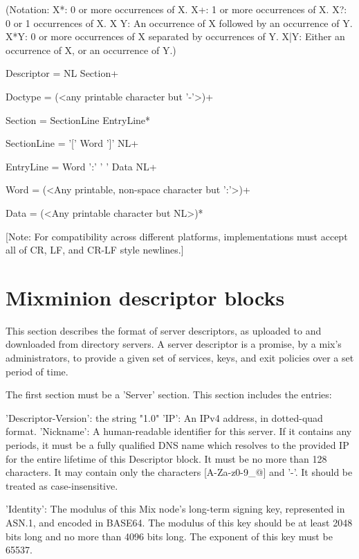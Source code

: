 (Notation:  X*: 0 or more occurrences of X.
            X+: 1 or more occurrences of X.
            X?: 0 or 1 occurrences of X.
            X Y: An occurrence of X followed by an occurrence of Y.
            X*{Y}: 0 or more occurrences of X separated by occurrences
                  of Y.
            X|Y: Either an occurrence of X, or an occurrence of Y.)

Descriptor = NL Section+ 

Doctype = (<any printable character but '-'>)+

Section = SectionLine EntryLine*

SectionLine = '[' Word ']' NL+

EntryLine = Word ':' ' ' Data NL+

Word = (<Any printable, non-space character but ':'>)+

Data = (<Any printable character but NL>)*

[Note: For compatibility across different platforms, implementations must
  accept all of CR, LF, and CR-LF style newlines.]

\section{Mixminion descriptor blocks}

This section describes the format of server descriptors, as uploaded
to and downloaded from directory servers.  A server descriptor is a
promise, by a mix's administrators, to provide a given set of
services, keys, and exit policies over a set period of time.

The first section must be a 'Server' section.  This section includes
the entries:

     'Descriptor-Version':  the string "1.0"
     'IP': An IPv4 address, in dotted-quad format.
     'Nickname': A human-readable identifier for this server.  If it
         contains any periods, it must be a fully qualified DNS name
         which resolves to the provided IP for the entire lifetime of
         this Descriptor block.  It must be no more than 128
         characters.  It may contain only the characters 
         [A-Za-z0-9_@] and '-'.  It should be treated as
         case-insensitive.

     'Identity': The modulus of this Mix node's long-term signing key,
         represented in ASN.1, and encoded in BASE64.  The modulus of
         this key should be at least 2048 bits long and no more than
         4096 bits long.  The exponent of this key must be 65537.

